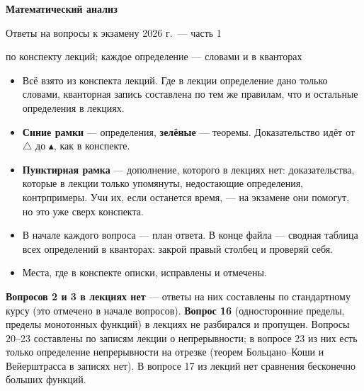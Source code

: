 \documentclass[a4paper,11pt]{article}
\begin{document}
\thispagestyle{empty}
\begin{center}
  {\LARGE\bfseries Математический анализ}\par\medskip
  {\Large Ответы на вопросы к экзамену 2026 г.\ --- часть 1}\par\medskip
  {\normalsize по конспекту лекций; каждое определение --- словами и в кванторах}
\end{center}
\bigskip

\begin{tcolorbox}[colback=white, colframe=black!40, boxrule=0.4pt, arc=2pt,
  title={Как устроен этот файл}, fonttitle=\bfseries, colbacktitle=black!8, coltitle=black]
\begin{itemize}[leftmargin=*]
  \item Всё взято из конспекта лекций. Где в лекции определение дано только словами,
        кванторная запись составлена по тем же правилам, что и остальные определения в лекциях.
  \item \textcolor{oprc}{\textbf{Синие рамки}} --- определения, \textcolor{teoc}{\textbf{зелёные}} --- теоремы.
        Доказательство идёт от $\triangle$ до $\blacktriangle$, как в конспекте.
  \item \textbf{Пунктирная рамка} --- дополнение, которого в лекциях нет: доказательства,
        которые в лекции только упомянуты, недостающие определения, контрпримеры.
        Учи их, если останется время, --- на экзамене они помогут, но это уже сверх конспекта.
  \item В начале каждого вопроса --- план ответа. В конце файла --- сводная таблица всех
        определений в кванторах: закрой правый столбец и проверяй себя.
  \item Места, где в конспекте описки, исправлены и отмечены.
\end{itemize}
\end{tcolorbox}

\textbf{Вопросов 2 и 3 в лекциях нет} --- ответы на них составлены по стандартному курсу (это отмечено в начале вопросов).
\textbf{Вопрос 16} (односторонние пределы, пределы монотонных функций) в лекциях не разбирался и пропущен.
Вопросы 20--23 составлены по записям лекции о непрерывности; в вопросе 23 из них есть только
определение непрерывности на отрезке (теорем Больцано--Коши и Вейерштрасса в записях нет).
В вопросе 17 из лекций нет сравнения бесконечно больших функций.

\medskip
\begingroup
\renewcommand{\contentsname}{Содержание}
\makeatletter\renewcommand{\@tocrmarg}{3.5em}\makeatother
\raggedright
\tableofcontents
\endgroup
\end{document}
